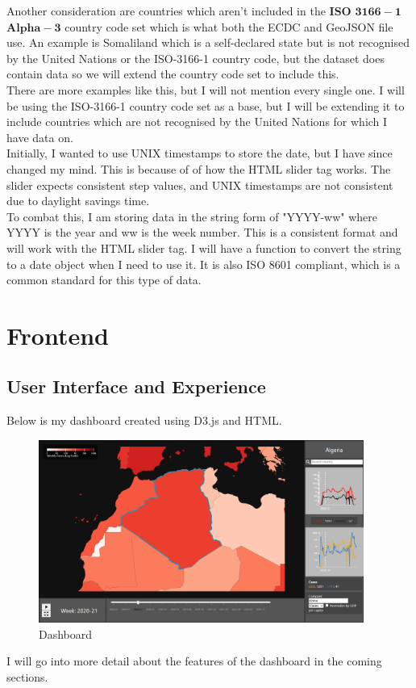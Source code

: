 \documentclass{report}
\begin{document}
Another consideration are countries which aren't included in the $\mathbf{ISO}$ $\mathbf{3166-1}$ $\mathbf{Alpha-3}$ country code set which is what both the ECDC and GeoJSON file use. An example is Somaliland which is a self-declared state but is not recognised by the United Nations or the ISO-3166-1 country code, but the dataset does contain data so we will extend the country code set to include this.\\

There are more examples like this, but I will not mention every single one. I will be using the ISO-3166-1 country code set as a base, but I will be extending it to include countries which are not recognised by the United Nations for which I have data on.\\
\newpage
Initially, I wanted to use UNIX timestamps to store the date, but I have since changed my mind. This is because of of how the HTML slider tag works. The slider expects consistent step values, and UNIX timestamps are not consistent due to daylight savings time.\\

To combat this, I am storing data in the string form of "YYYY-ww" where YYYY is the year and ww is the week number. This is a consistent format and will work with the HTML slider tag. I will have a function to convert the string to a date object when I need to use it. It is also ISO 8601 compliant, which is a common standard for this type of data.

\section{Frontend}
\subsection{User Interface and Experience}
Below is my dashboard created using D3.js and HTML.
\begin{center}
    \begin{figure}[h]
        \centering
        \includegraphics[width=0.95\textwidth]{Images/dashboard.png}
        \caption{Dashboard}
        \label{fig:dashboard}
    \end{figure}
\end{center}
I will go into more detail about the features of the dashboard in the coming sections.
\end{document}
